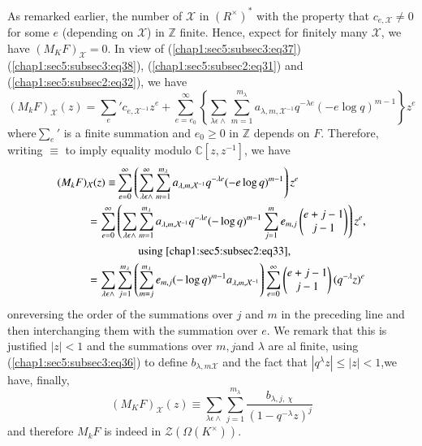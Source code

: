 As remarked earlier, the number of $\mathcal{X}$ in
$(R^\times )^* $ with the property that $c_{e,\mathcal{X}}\neq 0$
for some $e$ (depending on $\mathcal{X}$) in $\mathbb{Z}$
finite. Hence, expect for finitely many $\mathcal{X}$, we have
$(M_{K}F)_{\mathcal{X}}=0$. In view of (\ref{chap1:sec5:subsec3:eq37})
(\ref{chap1:sec5:subsec3:eq38}), (\ref{chap1:sec5:subsec2:eq31}) and
(\ref{chap1:sec5:subsec2:eq32}), we
have
\begin{equation*}
  (M_{k}F)_{\mathcal{X}}(z)=\sum\limits_{e}' c_{e,\mathcal{X}^{-1}}
  z^{e} + \sum\limits_{e=e_{0}}^{\infty} 
    \left\{\sum\limits_{\lambda \epsilon
      \wedge}\sum\limits_{m=1}^{m_{\lambda}}a_{\lambda,m,\mathcal{X}^{-1}}q^{-\lambda
      e}(-e \log q)^{m-1}\right\} z^{e}
  \end{equation*}
  where$\sum\limits_{e}'$ is a finite summation and $e_{0}\ge 0$ in
  $\mathbb{Z}$ depends on $F$. Therefore, writing $\equiv $ to imply
  equality modulo $\mathbb{C}[z,z^{-1}]$, we have
  \begin{align*}
    (M_{k}F)_{\mathcal{X}}(z) \equiv&  \sum\limits_{e=0}^{\infty}
    \left(\sum\limits_{\lambda  \epsilon
      \wedge}^{\infty}\sum\limits_{m=1}^{m_{\lambda}}
    a_{\lambda,m,\mathcal{X}^{-1}} q^{-\lambda
      e}(-e \log q)^{m-1}\right)z^{e}\\
     = \sum\limits_{e=0}^{\infty} & \left(\sum\limits_{\lambda \epsilon
      \wedge}\sum\limits_{m=1}^{m_{\lambda}}a_{\lambda,m,\mathcal{X}^{-1}}q^{-\lambda
      e}(-\log q)^{m-1}\sum\limits_{j=1}^{m} e_{m,j}
  \begin{pmatrix}
    e+j-1\\
    j-1
  \end{pmatrix}
   \right)z^{e},\\
   & \tag*{using \ref{chap1:sec5:subsec2:eq33},}\\ 
    = \sum\limits_{\lambda \epsilon \wedge} & \sum\limits_{j=1}^{m_{\lambda}}
    \left(\sum\limits_{m=j}^{m_{\lambda}} e_{m,j}(-\log
    q)^{m-1}a_{\lambda,m,\mathcal{X}^{-1}} \right) \sum\limits_{e=0}^{\infty}
  \begin{pmatrix}
    e+j-1\\
    j-1
  \end{pmatrix}
   (q^{-\lambda}z)^{e}     
  \end{align*}
  on\pageoriginale reversing the order of the summations over $j$ and $m$ in the
  preceding line and then interchanging them with the summation over
  $e$. We remark that this is justified $|z|<1$ and the summations over
  $m,j $and $\lambda$ are al finite, using
  (\ref{chap1:sec5:subsec3:eq36}) to define 
  $b_{\lambda,m \mathcal{X}}$ and the fact that
  $|q^{\lambda}z|\le|z|<1$,we have, finally,
  \begin{equation*}
    (M_{K}F)_{\mathcal{X}}(z)\equiv \sum\limits_{\lambda\epsilon
      \wedge}\sum\limits_{j=1}^{m_{\lambda}}\frac{b_{\lambda,j,~
        \chi}}{(1-q^{-\lambda}z)^{j}}  
  \end{equation*}
  and therefore $M_{k}F$ is indeed in $\mathscr{Z}(\Omega(K^\times ))$.


